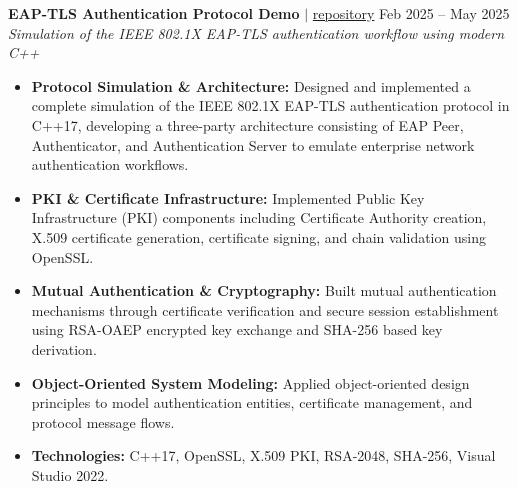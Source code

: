 \documentclass[10pt,a4paper]{article}
\begin{document}
\noindent \textbf{EAP-TLS Authentication Protocol Demo} $|$ \href{https://github.com/vyquochuy/EAP-TLS-DEMO}{repository} \hfill Feb 2025 -- May 2025\\
\textit{Simulation of the IEEE 802.1X EAP-TLS authentication workflow using modern C++}
\begin{itemize}[leftmargin=0.25in, nosep]
    \item \textbf{Protocol Simulation \& Architecture:} Designed and implemented a complete simulation of the IEEE 802.1X EAP-TLS authentication protocol in C++17, developing a three-party architecture consisting of EAP Peer, Authenticator, and Authentication Server to emulate enterprise network authentication workflows.
    \item \textbf{PKI \& Certificate Infrastructure:} Implemented Public Key Infrastructure (PKI) components including Certificate Authority creation, X.509 certificate generation, certificate signing, and chain validation using OpenSSL.
    \item \textbf{Mutual Authentication \& Cryptography:} Built mutual authentication mechanisms through certificate verification and secure session establishment using RSA-OAEP encrypted key exchange and SHA-256 based key derivation.
    \item \textbf{Object-Oriented System Modeling:} Applied object-oriented design principles to model authentication entities, certificate management, and protocol message flows.
    \item \textbf{Technologies:} C++17, OpenSSL, X.509 PKI, RSA-2048, SHA-256, Visual Studio 2022.
\end{itemize}
\vspace{10pt}
\end{document}
